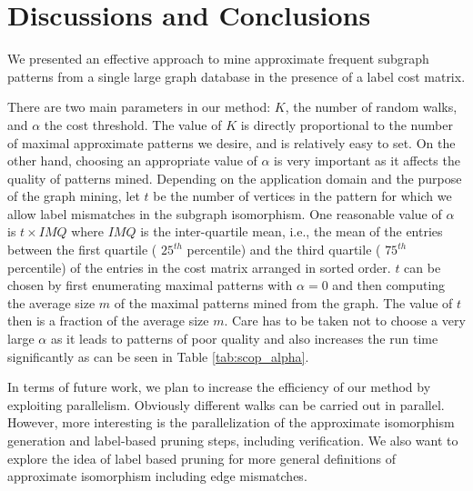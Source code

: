 \section{Discussions and Conclusions}
\label{sec:conclusions}

We presented an effective approach to mine approximate frequent subgraph
patterns from a single large graph database in the presence of
a label cost matrix.

There are two main parameters in our method: $K$, the number of random
walks, and $\alpha$ the cost threshold. The value of $K$ is directly
proportional to the number of maximal approximate patterns we desire,
and is relatively easy to set.
On the other hand, choosing an appropriate value of
$\alpha$ is very important as it affects the quality of
patterns mined. Depending on the application domain
and the purpose of the graph mining, let $t$ be the number of
vertices in the pattern for which we allow label mismatches
in the subgraph isomorphism. One reasonable value of
$\alpha$ is $t \times IMQ$ where $IMQ$ is the inter-quartile mean,
i.e., the mean of the entries between the first quartile ( $25^{th}$
percentile) and the third quartile ( $75^{th}$ percentile)
of the entries in the cost matrix arranged in sorted order. 
$t$ can be chosen by first
enumerating maximal patterns with $\alpha = 0$ and then computing the 
average size $m$ of the maximal patterns mined from the graph.
The value of $t$ then is a fraction of the average size $m$.
Care has to be taken not to choose a very large $\alpha$ as it leads to
patterns of poor quality and also increases the run time 
significantly as can be seen in Table \ref{tab:scop_alpha}.

In terms of future work, we plan to increase the efficiency of our
method by exploiting parallelism. Obviously different walks can be
carried out in parallel. However, more interesting is the
parallelization of the approximate isomorphism generation and
label-based pruning steps, including verification. We also
want to explore the idea of label based pruning for more
general definitions of approximate isomorphism including 
edge mismatches.

